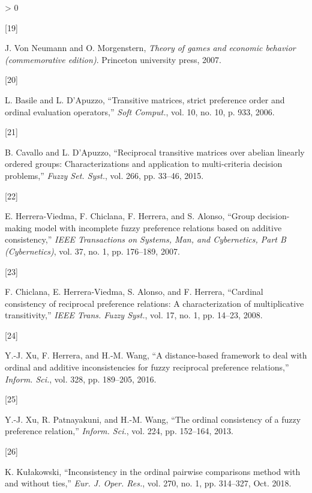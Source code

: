 \documentclass[
]{article}
\newlength{\cslhangindent}
\newlength{\csllabelwidth}
\newenvironment{CSLReferences}[2] %
 {%
  \setlength{\parindent}{0pt}
  \ifodd #1 \everypar{\setlength{\hangindent}{\cslhangindent}}\ignorespaces\fi
  \ifnum #2 > 0
  \setlength{\parskip}{#2\baselineskip}
  \fi
 }%
 {}
\newcommand{\CSLLeftMargin}[1]{\parbox[t]{\csllabelwidth}{#1}}
\newcommand{\CSLRightInline}[1]{\parbox[t]{\linewidth - \csllabelwidth}{#1}\break}
\begin{document}
\begin{CSLReferences}{0}{0}
\leavevmode\hypertarget{ref-von2007theory}{}%
\CSLLeftMargin{{[}19{]} }
\CSLRightInline{J. Von Neumann and O. Morgenstern, \emph{Theory of games
and economic behavior (commemorative edition)}. {Princeton university
press}, 2007.}

\leavevmode\hypertarget{ref-basile2006transitive}{}%
\CSLLeftMargin{{[}20{]} }
\CSLRightInline{L. Basile and L. D'Apuzzo, {``Transitive matrices,
strict preference order and ordinal evaluation operators,''} \emph{Soft
Comput.}, vol. 10, no. 10, p. 933, 2006.}

\leavevmode\hypertarget{ref-cavallo2015reciprocal}{}%
\CSLLeftMargin{{[}21{]} }
\CSLRightInline{B. Cavallo and L. D'Apuzzo, {``Reciprocal transitive
matrices over abelian linearly ordered groups: {Characterizations} and
application to multi-criteria decision problems,''} \emph{Fuzzy Set.
Syst.}, vol. 266, pp. 33--46, 2015.}

\leavevmode\hypertarget{ref-Herrere2007}{}%
\CSLLeftMargin{{[}22{]} }
\CSLRightInline{E. Herrera-Viedma, F. Chiclana, F. Herrera, and S.
Alonso, {``Group decision-making model with incomplete fuzzy preference
relations based on additive consistency,''} \emph{IEEE Transactions on
Systems, Man, and Cybernetics, Part B (Cybernetics)}, vol. 37, no. 1,
pp. 176--189, 2007.}

\leavevmode\hypertarget{ref-chiclana2008cardinal}{}%
\CSLLeftMargin{{[}23{]} }
\CSLRightInline{F. Chiclana, E. Herrera-Viedma, S. Alonso, and F.
Herrera, {``Cardinal consistency of reciprocal preference relations: A
characterization of multiplicative transitivity,''} \emph{IEEE Trans.
Fuzzy Syst.}, vol. 17, no. 1, pp. 14--23, 2008.}

\leavevmode\hypertarget{ref-xu2016distance}{}%
\CSLLeftMargin{{[}24{]} }
\CSLRightInline{Y.-J. Xu, F. Herrera, and H.-M. Wang, {``A
distance-based framework to deal with ordinal and additive
inconsistencies for fuzzy reciprocal preference relations,''}
\emph{Inform. Sci.}, vol. 328, pp. 189--205, 2016.}

\leavevmode\hypertarget{ref-xu2013ordinal}{}%
\CSLLeftMargin{{[}25{]} }
\CSLRightInline{Y.-J. Xu, R. Patnayakuni, and H.-M. Wang, {``The ordinal
consistency of a fuzzy preference relation,''} \emph{Inform. Sci.}, vol.
224, pp. 152--164, 2013.}

\leavevmode\hypertarget{ref-kulakowski2018inconsistency}{}%
\CSLLeftMargin{{[}26{]} }
\CSLRightInline{K. Kułakowski, {``Inconsistency in the ordinal pairwise
comparisons method with and without ties,''} \emph{Eur. J. Oper. Res.},
vol. 270, no. 1, pp. 314--327, Oct. 2018.}


\end{CSLReferences}
\end{document}
